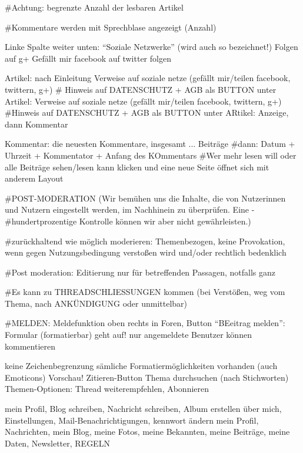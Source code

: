 #Achtung: begrenzte Anzahl der lesbaren Artikel

#Kommentare werden mit Sprechblase angezeigt (Anzahl)

Linke Spalte weiter unten: ``Soziale Netzwerke'' (wird auch so bezeichnet!)
Folgen auf g+
Gefällt mir facebook
auf twitter folgen 

Artikel: nach Einleitung Verweise auf soziale netze (gefällt mir/teilen facebook, twittern, g+) 
# Hinweis auf DATENSCHUTZ + AGB als BUTTON
unter Artikel: Verweise auf soziale netze (gefällt mir/teilen facebook, twittern, g+) 
#Hinweis auf DATENSCHUTZ + AGB als BUTTON
unter ARtikel: Anzeige, dann Kommentar

Kommentar: die neuesten Kommentare, insgesamt ... Beiträge
#dann: Datum + Uhrzeit + Kommentator + Anfang des KOmmentars
#Wer mehr lesen will oder alle Beiträge sehen/lesen kann klicken und eine neue Seite öffnet sich mit anderem Layout

#POST-MODERATION (Wir bemühen uns die Inhalte, die von Nutzerinnen und Nutzern eingestellt werden, im Nachhinein zu überprüfen. Eine -#hundertprozentige Kontrolle können wir aber nicht gewährleisten.)

#zurückhaltend wie möglich moderieren: Themenbezogen, keine Provokation, wenn gegen Nutzungsbedingung verstoßen wird und/oder rechtlich bedenklich

#Post moderation: Editierung nur für betreffenden Passagen, notfalls ganz

#Es kann zu THREADSCHLIESSUNGEN kommen (bei Verstößen, weg vom Thema, nach ANKÜNDIGUNG oder unmittelbar)

#MELDEN: Meldefunktion oben rechts in Foren, Button ``BEeitrag melden'': Formular (formatierbar) geht auf! nur angemeldete Benutzer können kommentieren

keine Zeichenbegrenzung
sämliche Formatiermöglichkeiten vorhanden (auch Emoticons)
Vorschau!
Zitieren-Button
Thema durchsuchen (nach Stichworten)
Themen-Optionen: Thread weiterempfehlen, Abonnieren


mein Profil, Blog schreiben, Nachricht schreiben, Album erstellen 
über mich, Einstellungen, Mail-Benachrichtigungen, kennwort ändern
mein Profil, Nachrichten, mein Blog, meine Fotos, meine Bekannten, meine Beiträge, meine Daten, Newsletter, REGELN

